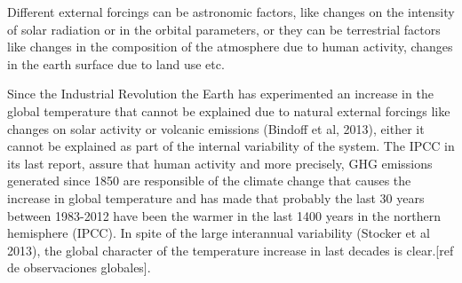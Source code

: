 Different external forcings can be astronomic factors, like changes on the intensity of solar radiation or in the orbital parameters, or they can be terrestrial factors like changes in the composition of the atmosphere due to human activity, changes in the earth surface due to land use etc.




Since the Industrial Revolution the Earth has experimented an increase in the global temperature that cannot be explained due to natural external forcings like changes on solar activity or volcanic emissions (Bindoff et al, 2013), either it cannot be explained as part of the internal variability of the system. The IPCC in its last report, assure that human activity and more precisely, GHG emissions generated since 1850 are responsible of the climate change that causes the increase in global temperature and has made that probably the last 30 years between 1983-2012 have been the warmer in the last 1400 years in the northern hemisphere (IPCC). In spite of the large interannual variability (Stocker et al 2013), the global character of the temperature increase in last decades is clear.[ref de observaciones globales].

